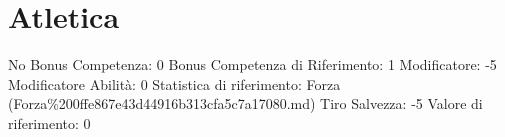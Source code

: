 \section{Atletica}\label{atletica}

\begin{description}
\tightlist
\item[Tags: ABI]
No Bonus Competenza: 0 Bonus Competenza di Riferimento: 1 Modificatore:
-5 Modificatore Abilità: 0 Statistica di riferimento: Forza
(Forza\%200ffe867e43d44916b313cfa5c7a17080.md) Tiro Salvezza: -5 Valore
di riferimento: 0
\end{description}
